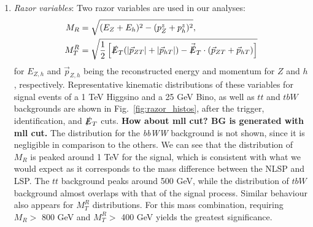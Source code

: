 \documentclass[a4paper,11pt]{article}
\newcommand{\Shufang}[1]{{\bf\color{Maroon}  #1}}
\begin{document}
\begin{enumerate}
  \item \emph{Razor variables}:  Two razor variables are used in our analyses: 
\begin{align}
M_R &= \sqrt{(E_Z+E_h)^2 - (p_Z^z + p_h^z)^2},\\
M_T^R &= \sqrt{\frac{1}{2}\left[\slashed{E}_T(|\vec{p}_{ZT}|+|\vec{p}_{hT}|)
- \vec{\slashed{E}}_T\cdot(\vec{p}_{ZT}+\vec{p}_{hT})\right]}
\end{align}
 for $E_{Z,h}$ and $\vec{p}_{Z,h}$ being the reconstructed energy and momentum for $Z$ and $h$, respectively.
      Representative kinematic
  distributions of these variables for signal events of a 1 TeV Higgsino and a 25 GeV Bino, as well as $tt$ and $tbW$ backgrounds are
  shown in Fig.~\ref{fig:razor_histos}, after the trigger, identification, and
  $\slashed{E}_{T}$ cuts.  \Shufang{How about mll cut? BG is generated with mll cut.}  The
  distribution for the \emph{bbWW} background is not shown, since it is negligible in
  comparison to the others.   We can see that the distribution of $M_R$ is peaked
  around 1 TeV for the signal, which is consistent with what we would expect as   it corresponds to the mass difference between the NLSP and LSP.  The $tt$ background peaks around 500 GeV, while the distribution of $tbW$ background almost overlaps with that of the signal process.  Similar behaviour also appears for $M_T^R$ distributions.  
  For this mass combination, requiring $M_R >$ 800
  GeV and $M_T^R >$ 400 GeV yields the greatest significance.

\end{enumerate}
\end{document}
